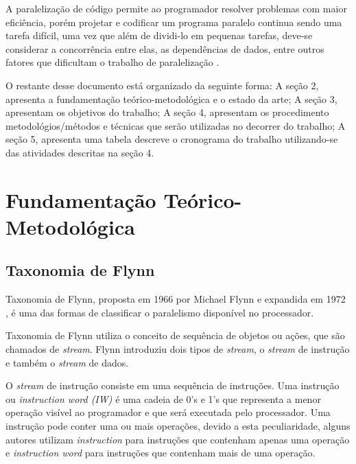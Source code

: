 \documentclass[12pt]{article}
\begin{document}
A paralelização de código permite ao programador resolver problemas com maior 
eficiência, porém projetar e codificar um programa paralelo continua sendo uma 
tarefa difícil, uma vez que além de dividi-lo em pequenas tarefas, deve-se 
considerar a concorrência entre elas, as dependências de dados, entre outros 
fatores que dificultam o trabalho de 
paralelização \cite{aipp}.

O restante desse documento está organizado da seguinte forma: A seção 2, 
apresenta a fundamentação teórico-metodológica e o estado da arte;
A seção 3, apresentam os objetivos do trabalho; A seção 4, apresentam os 
procedimento metodológios/métodos e técnicas que serão
utilizadas no decorrer do trabalho; A seção 5, apresenta uma tabela descreve o 
cronograma do trabalho utilizando-se das atividades descritas na seção 4.

\section{Fundamentação Teórico-Metodológica}
\label{sec:fundamentacao}


\subsection{Taxonomia de Flynn}

Taxonomia de Flynn, proposta em 1966 \cite{Flynn:1966} por Michael 
Flynn e expandida em 1972 \cite{Flynn:1972}, é uma das formas de classificar o 
paralelismo disponível no processador.  

Taxonomia de Flynn utiliza o conceito de sequência de objetos ou ações, que são
chamados de \textit{stream}.
Flynn introduziu dois tipos de \textit{stream}, o 
\textit{stream} de instrução e também o \textit{stream} de dados. 

O \textit{stream} de instrução consiste em uma sequência de instruções. 
Uma instrução ou \textit{instruction word (IW)} é uma cadeia de 0's e 1's que 
representa a menor operação visível ao programador e que será executada pelo 
processador. 
Uma instrução pode conter uma ou mais operações, devido a esta peculiaridade,
alguns autores utilizam \textit{instruction} para instruções que contenham 
apenas uma operação e \textit{instruction word} para instruções que contenham 
mais de uma operação.
\end{document}
